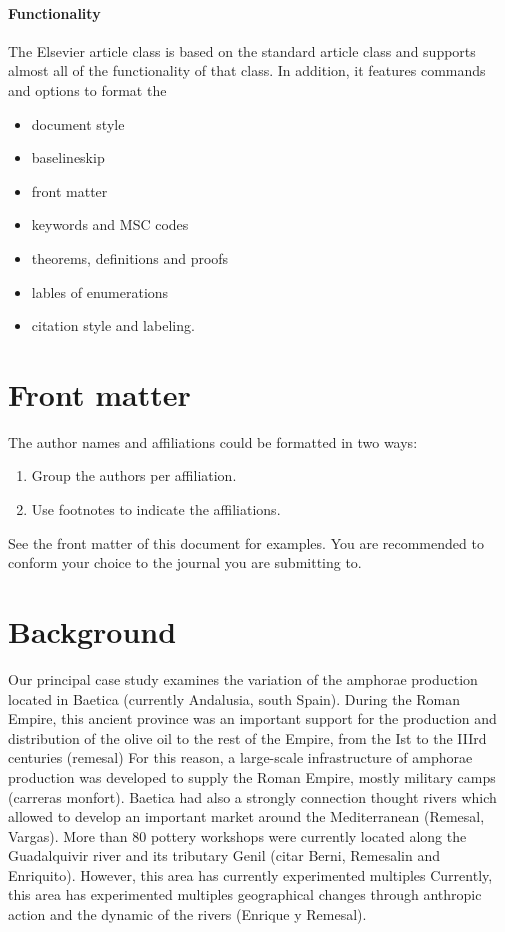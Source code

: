 \documentclass[review, twocolumn]{elsarticle}
\begin{document}
\paragraph{Functionality} The Elsevier article class is based on the standard article class and supports almost all of the functionality of that class. In addition, it features commands and options to format the
\begin{itemize}
\item document style
\item baselineskip
\item front matter
\item keywords and MSC codes
\item theorems, definitions and proofs
\item lables of enumerations
\item citation style and labeling.
\end{itemize}

\section{Front matter}

The author names and affiliations could be formatted in two ways:
\begin{enumerate}[(1)]
\item Group the authors per affiliation.
\item Use footnotes to indicate the affiliations.
\end{enumerate}
See the front matter of this document for examples. You are recommended to conform your choice to the journal you are submitting to.


\section{Background}

Our principal case study examines the variation of the amphorae production located in Baetica (currently Andalusia, south Spain). During the Roman Empire, this ancient province was an important support for the production and distribution of the olive oil to the rest of the Empire, from the Ist to the IIIrd centuries (remesal)
For this reason, a large-scale infrastructure of amphorae production was developed to supply the Roman Empire, mostly military camps (carreras monfort). Baetica had also a strongly connection thought rivers which allowed to develop an important market around the Mediterranean (Remesal, Vargas). More than 80 pottery workshops were currently located along the Guadalquivir river and its tributary Genil (citar Berni, Remesalin and Enriquito). However, this area has currently experimented multiples Currently, this area has experimented multiples geographical changes through anthropic action and the dynamic of the rivers (Enrique y Remesal). 
  
\end{document}
